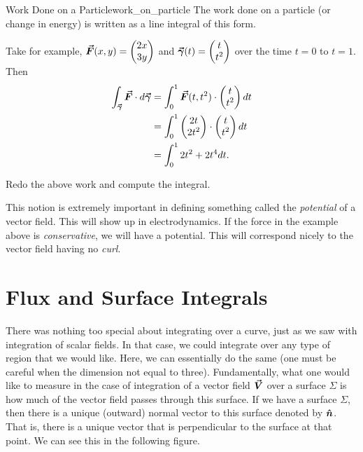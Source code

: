         \begin{ex}{Work Done on a Particle}{work_on_particle}
        The work done on a particle (or change in energy) is written as a line integral of this form.  
        
        Take for example, $\boldsymbol{\vec{F}}(x,y)=\begin{pmatrix} 2x \\ 3y \end{pmatrix}$ and $\boldsymbol{\vec{\gamma}}(t)=\begin{pmatrix} t \\ t^2 \end{pmatrix}$ over the time $t=0$ to $t=1$.  Then
        \begin{align*}
        \int_{\boldsymbol{\vec{\gamma}}} \boldsymbol{\vec{F}} \cdot d\boldsymbol{\vec{\gamma}} &= \int_0^1 \boldsymbol{\vec{F}}(t,t^2)\cdot \begin{pmatrix} t \\ t^2 \end{pmatrix} dt\\
        &= \int_0^1 \begin{pmatrix} 2t \\ 2t^2 \end{pmatrix} \cdot \begin{pmatrix} t \\ t^2 \end{pmatrix}dt\\
        &=\int_0^1 2t^2+2t^4dt.
        \end{align*}
        \end{ex}
        
        \begin{exercise}
        	Redo the above work and compute the integral.
        \end{exercise}
        
        \begin{remark}
        This notion is extremely important in defining something called the \emph{potential} of a vector field.  This will show up in electrodynamics. If the force in the example above is \emph{conservative}, we will have a potential.  This will correspond nicely to the vector field having no \emph{curl}.
        \end{remark}

         \section{Flux and Surface Integrals}
         
       	There was nothing too special about integrating over a curve, just as we saw with integration of scalar fields. In that case, we could integrate over any type of region that we would like.  Here, we can essentially do the same (one must be careful when the dimension not equal to three).  Fundamentally, what one would like to measure in the case of integration of a vector field $\boldsymbol{\vec{V}}$ over a surface $\Sigma$ is how much of the vector field passes through this surface.  If we have a surface $\Sigma$, then there is a unique (outward) normal vector to this surface denoted by $\boldsymbol{\hat{n}}$. That is, there is a unique vector that is perpendicular to the surface at that point. We can see this in the following figure.
       	
